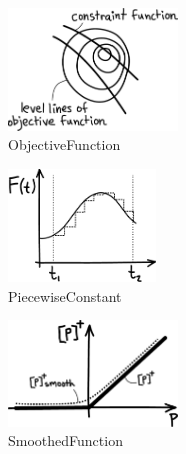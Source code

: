 \begin{figure}[h]		%
\begin{centering}
\includegraphics[width=0.4\textwidth]{Figures/ObjectiveFunction}\par
\end{centering}
\caption{ObjectiveFunction}
\label{fig:ObjectiveFunction}
\end{figure}
%


\begin{figure}[h]		%
\begin{centering}
\includegraphics[width=0.35\textwidth]{Figures/PiecewiseConstant}\par
\end{centering}
\caption{PiecewiseConstant}
\label{fig:PiecewiseConstant}
\end{figure}
%


\begin{figure}[h]		%
\begin{centering}
\includegraphics[width=0.4\textwidth]{Figures/SmoothedFunction}\par
\end{centering}
\caption{SmoothedFunction}
\label{fig:SmoothedFunction}
\end{figure}
%

